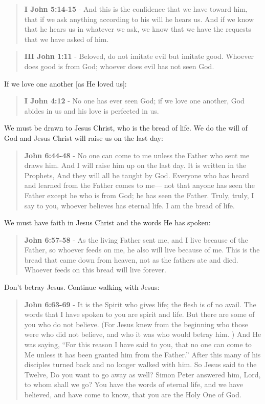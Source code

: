 \documentclass[11pt]{article}
\begin{document}
\begin{quote}
\textbf{I John 5:14-15} - And this is the confidence that we have toward him, that if we ask anything according to his will he hears us. And if we know that he hears us in whatever we ask, we know that we have the requests that we have asked of him.
\end{quote}

\begin{quote}
\textbf{III John 1:11} - Beloved, do not imitate evil but imitate good. Whoever does good is from God; whoever does evil has not seen God.
\end{quote}

If we love one another [as He loved us]:

\begin{quote}
\textbf{I John 4:12} - No one has ever seen God; if we love one another, God abides in us and his love is perfected in us.
\end{quote}

We must be drawn to Jesus Christ, who is the bread of life. We do the will of God and Jesus Christ will raise us on the last day:

\begin{quote}
\textbf{John 6:44-48} - No one can come to me unless the Father who sent me draws him. And I will raise him up on the last day. It is written in the Prophets, And they will all be taught by God. Everyone who has heard and learned from the Father comes to me— not that anyone has seen the Father except he who is from God; he has seen the Father. Truly, truly, I say to you, whoever believes has eternal life. I am the bread of life.
\end{quote}

We must have faith in Jesus Christ and the words He has spoken:

\begin{quote}
\textbf{John 6:57-58} - As the living Father sent me, and I live because of the Father, so whoever feeds on me, he also will live because of me. This is the bread that came down from heaven, not as the fathers ate and died. Whoever feeds on this bread will live forever.
\end{quote}

Don't betray Jesus. Continue walking with Jesus:

\begin{quote}
\textbf{John 6:63-69} - It is the Spirit who gives life; the flesh is of no avail. The words that I have spoken to you are spirit and life. But there are some of you who do not believe. (For Jesus knew from the beginning who those were who did not believe, and who it was who would betray him. ) And He was saying, “For this reason I have said to you, that no one can come to Me unless it has been granted him from the Father.” After this many of his disciples turned back and no longer walked with him. So Jesus said to the Twelve, Do you want to go away as well? Simon Peter answered him, Lord, to whom shall we go? You have the words of eternal life, and we have believed, and have come to know, that you are the Holy One of God.
\end{quote}
\end{document}

